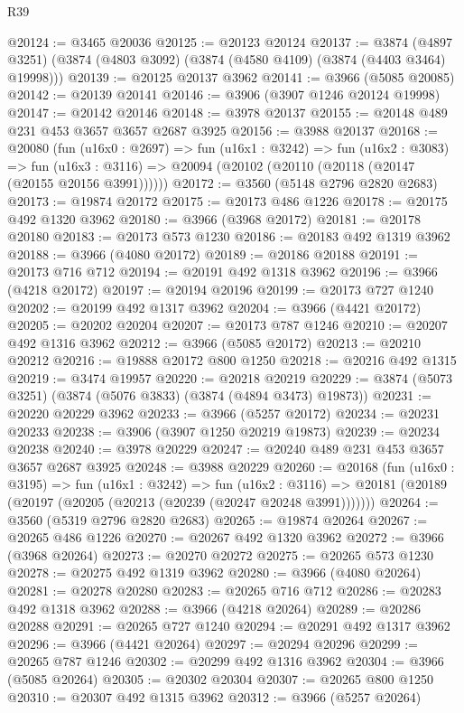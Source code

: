 \begin{lexlean}{R39}
\begin{coremodule}
@20124 := @3465 @20036
@20125 := @20123 @20124
@20137 := @3874
    (@4897 @3251)
    (@3874 (@4803 @3092) (@3874 (@4580 @4109) (@3874 (@4403 @3464) @19998)))
@20139 := @20125 @20137 @3962
@20141 := @3966 (@5085 @20085)
@20142 := @20139 @20141
@20146 := @3906 (@3907 @1246 @20124 @19998)
@20147 := @20142 @20146
@20148 := @3978 @20137
@20155 := @20148 @489 @231 @453 @3657 @3657 @2687 @3925
@20156 := @3988 @20137
@20168 := @20080
    (fun (u16x0 : @2697) =>
    fun (u16x1 : @3242) =>
    fun (u16x2 : @3083) =>
    fun (u16x3 : @3116) => @20094 (@20102 (@20110 (@20118 (@20147 (@20155 @20156 @3991))))))
@20172 := @3560 (@5148 @2796 @2820 @2683)
@20173 := @19874 @20172
@20175 := @20173 @486 @1226
@20178 := @20175 @492 @1320 @3962
@20180 := @3966 (@3968 @20172)
@20181 := @20178 @20180
@20183 := @20173 @573 @1230
@20186 := @20183 @492 @1319 @3962
@20188 := @3966 (@4080 @20172)
@20189 := @20186 @20188
@20191 := @20173 @716 @712
@20194 := @20191 @492 @1318 @3962
@20196 := @3966 (@4218 @20172)
@20197 := @20194 @20196
@20199 := @20173 @727 @1240
@20202 := @20199 @492 @1317 @3962
@20204 := @3966 (@4421 @20172)
@20205 := @20202 @20204
@20207 := @20173 @787 @1246
@20210 := @20207 @492 @1316 @3962
@20212 := @3966 (@5085 @20172)
@20213 := @20210 @20212
@20216 := @19888 @20172 @800 @1250
@20218 := @20216 @492 @1315
@20219 := @3474 @19957
@20220 := @20218 @20219
@20229 := @3874 (@5073 @3251) (@3874 (@5076 @3833) (@3874 (@4894 @3473) @19873))
@20231 := @20220 @20229 @3962
@20233 := @3966 (@5257 @20172)
@20234 := @20231 @20233
@20238 := @3906 (@3907 @1250 @20219 @19873)
@20239 := @20234 @20238
@20240 := @3978 @20229
@20247 := @20240 @489 @231 @453 @3657 @3657 @2687 @3925
@20248 := @3988 @20229
@20260 := @20168
    (fun (u16x0 : @3195) =>
    fun (u16x1 : @3242) =>
    fun (u16x2 : @3116) =>
    @20181 (@20189 (@20197 (@20205 (@20213 (@20239 (@20247 @20248 @3991)))))))
@20264 := @3560 (@5319 @2796 @2820 @2683)
@20265 := @19874 @20264
@20267 := @20265 @486 @1226
@20270 := @20267 @492 @1320 @3962
@20272 := @3966 (@3968 @20264)
@20273 := @20270 @20272
@20275 := @20265 @573 @1230
@20278 := @20275 @492 @1319 @3962
@20280 := @3966 (@4080 @20264)
@20281 := @20278 @20280
@20283 := @20265 @716 @712
@20286 := @20283 @492 @1318 @3962
@20288 := @3966 (@4218 @20264)
@20289 := @20286 @20288
@20291 := @20265 @727 @1240
@20294 := @20291 @492 @1317 @3962
@20296 := @3966 (@4421 @20264)
@20297 := @20294 @20296
@20299 := @20265 @787 @1246
@20302 := @20299 @492 @1316 @3962
@20304 := @3966 (@5085 @20264)
@20305 := @20302 @20304
@20307 := @20265 @800 @1250
@20310 := @20307 @492 @1315 @3962
@20312 := @3966 (@5257 @20264)

\end{coremodule}
\end{lexlean}
